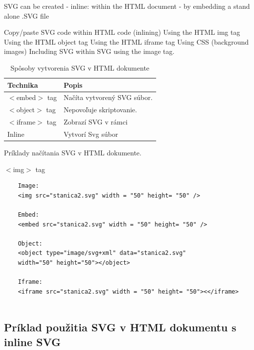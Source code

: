 
SVG can be created 
-   inline: within the HTML document 
-   by embedding a stand alone .SVG file


Copy/paste SVG code within HTML code (inlining)
Using the HTML img tag
Using the HTML object tag
Using the HTML iframe tag
Using CSS (background images)
Including SVG within SVG using the image tag.




\begin{table}[h]
	\begin{center}
		\begin{tabular}{|l|l|}
			\hline \textbf{Technika} & \textbf{Popis} \\ 
			\hline $<$embed$>$ tag & Načíta vytvorený SVG súbor.  \\ 
			\hline $<$object$>$ tag & Nepovoľuje skriptovanie.  \\ 
			\hline $<$iframe$>$ tag & Zobrazí SVG v rámci  \\ 
			\hline Inline & Vytvorí Svg súbor \\ 
			\hline 
		\end{tabular} 
	\end{center}
	\caption{Spôsoby vytvorenia SVG v HTML dokumente}
	\label{vytvorenie:SVG}
\end{table}

Príklady načítania SVG v HTML dokumente.

$<$img$>$ tag 

\begin{lstlisting}
	Image:
	<img src="stanica2.svg" width = "50" height= "50" />
	
	Embed:
	<embed src="stanica2.svg" width = "50" height= "50" />
	
	Object:
	<object type="image/svg+xml" data="stanica2.svg"
	width="50" height="50"></object>
	
	Iframe:
	<iframe src="stanica2.svg" width = "50" height= "50"><</iframe>
	
\end{lstlisting}






\subsection{Príklad použitia SVG v HTML dokumentu s inline SVG }


